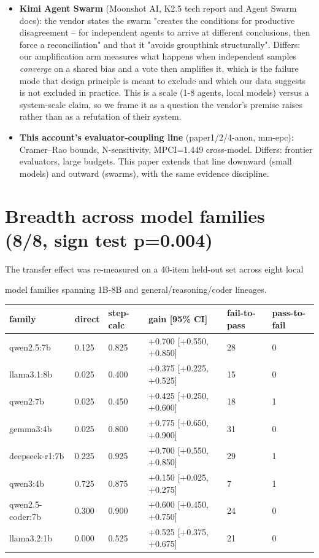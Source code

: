 \documentclass[11pt]{article}
\begin{document}
\begin{itemize}
\item {\bf Kimi Agent Swarm} (Moonshot AI, K2.5 tech report and Agent Swarm docs): the vendor states the swarm "creates the conditions for productive disagreement -- for independent agents to arrive at different conclusions, then force a reconciliation" and that it "avoids groupthink structurally". Differs: our amplification arm measures what happens when independent samples {\it converge} on a shared bias and a vote then amplifies it, which is the failure mode that design principle is meant to exclude and which our data suggests is not excluded in practice. This is a scale (1-8 agents, local models) versus a system-scale claim, so we frame it as a question the vendor's premise raises rather than as a refutation of their system.
\item {\bf This account's evaluator-coupling line} (paper1/2/4-anon, mm-epc): Cramer--Rao bounds, N-sensitivity, MPCI=1.449 cross-model. Differs: frontier evaluators, large budgets. This paper extends that line downward (small models) and outward (swarms), with the same evidence discipline.
\end{itemize}

\section*{Breadth across model families (8/8, sign test p=0.004)}

The transfer effect was re-measured on a 40-item held-out set across eight local

model families spanning 1B-8B and general/reasoning/coder lineages.


\begin{center}\small\begin{tabular}{llllll}\hline
family & direct & step-calc & gain [95\% CI] & fail-to-pass & pass-to-fail \\
\hline
qwen2.5:7b & 0.125 & 0.825 & +0.700 [+0.550, +0.850] & 28 & 0 \\
llama3.1:8b & 0.025 & 0.400 & +0.375 [+0.225, +0.525] & 15 & 0 \\
qwen2:7b & 0.025 & 0.450 & +0.425 [+0.250, +0.600] & 18 & 1 \\
gemma3:4b & 0.025 & 0.800 & +0.775 [+0.650, +0.900] & 31 & 0 \\
deepseek-r1:7b & 0.225 & 0.925 & +0.700 [+0.550, +0.850] & 29 & 1 \\
qwen3:4b & 0.725 & 0.875 & +0.150 [+0.025, +0.275] & 7 & 1 \\
qwen2.5-coder:7b & 0.300 & 0.900 & +0.600 [+0.450, +0.750] & 24 & 0 \\
llama3.2:1b & 0.000 & 0.525 & +0.525 [+0.375, +0.675] & 21 & 0 \\
\end{tabular}\end{center}
\end{document}
